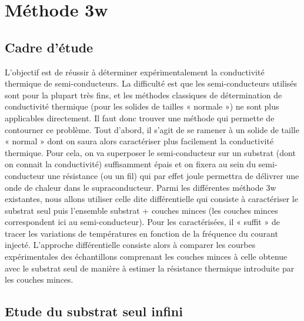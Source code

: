 \documentclass[10pt,a4paper]{report}
\begin{document}
\chapter{Méthode 3w}
\section{Cadre d'étude}
L’objectif est de réussir à déterminer expérimentalement la conductivité thermique de semi-conducteurs. La difficulté est que les semi-conducteurs utilisés sont pour la plupart très fins, et les méthodes classiques de détermination de conductivité thermique (pour les solides de tailles « normale ») ne sont plus applicables directement. Il faut donc trouver une méthode qui permette de contourner ce problème. Tout d’abord, il s’agit de se ramener à un solide de taille « normal » dont on saura alors caractériser plus facilement la conductivité thermique. Pour cela, on va superposer le semi-conducteur sur un substrat (dont on connait la conductivité) suffisamment épais et on fixera au sein du semi-conducteur une résistance (ou un fil) qui par effet joule permettra de délivrer une onde de chaleur dans le supraconducteur. Parmi les différentes méthode 3w existantes, nous allons utiliser celle dite différentielle qui consiste à caractériser le substrat seul puis l’ensemble substrat + couches minces (les couches minces correspondent ici au semi-conducteur). Pour les caractérisées, il « suffit » de tracer les variations de températures en fonction de la fréquence du courant injecté. L'approche différentielle consiste alors à comparer les courbes expérimentales des échantillons comprenant les couches minces à celle obtenue avec le substrat seul de manière à estimer la résistance thermique introduite par les couches minces.
\section{Etude du substrat seul infini}
\end{document}
